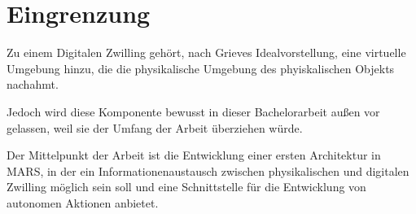 \section{Eingrenzung}


Zu einem Digitalen Zwilling gehört, nach Grieves Idealvorstellung, eine virtuelle Umgebung hinzu, die die physikalische Umgebung des phyiskalischen Objekts nachahmt.

Jedoch wird diese Komponente bewusst in dieser Bachelorarbeit außen vor gelassen, weil sie der Umfang der Arbeit überziehen würde.

Der Mittelpunkt der Arbeit ist die Entwicklung einer ersten Architektur in MARS, in der ein Informationenaustausch zwischen physikalischen und digitalen Zwilling möglich sein soll und eine Schnittstelle für die Entwicklung von autonomen Aktionen anbietet. 

